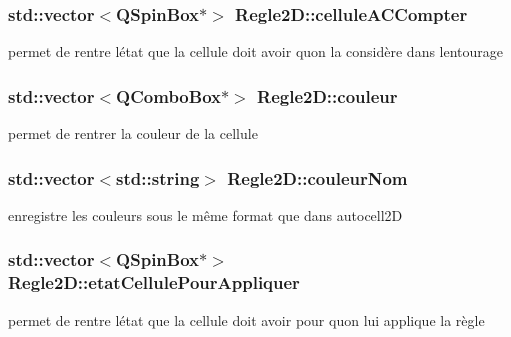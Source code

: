 \subsubsection[{\texorpdfstring{cellule\+A\+C\+Compter}{celluleACCompter}}]{\setlength{\rightskip}{0pt plus 5cm}std\+::vector$<$Q\+Spin\+Box$\ast$$>$ Regle2\+D\+::cellule\+A\+C\+Compter\hspace{0.3cm}{\ttfamily [protected]}}\hypertarget{class_regle2_d_aff3f269a5118bda47bcdf133d26010e6}{}\label{class_regle2_d_aff3f269a5118bda47bcdf133d26010e6}
permet de rentre l\textquotesingle{}état que la cellule doit avoir qu\textquotesingle{}on la considère dans l\textquotesingle{}entourage 
\subsubsection[{\texorpdfstring{couleur}{couleur}}]{\setlength{\rightskip}{0pt plus 5cm}std\+::vector$<$Q\+Combo\+Box$\ast$$>$ Regle2\+D\+::couleur\hspace{0.3cm}{\ttfamily [protected]}}\hypertarget{class_regle2_d_a57b848611ac63837d30790b5ddec9299}{}\label{class_regle2_d_a57b848611ac63837d30790b5ddec9299}
permet de rentrer la couleur de la cellule 
\subsubsection[{\texorpdfstring{couleur\+Nom}{couleurNom}}]{\setlength{\rightskip}{0pt plus 5cm}std\+::vector$<$std\+::string$>$ Regle2\+D\+::couleur\+Nom\hspace{0.3cm}{\ttfamily [protected]}}\hypertarget{class_regle2_d_aece48b7d62d4dc0ebfc8fd7334e7d9be}{}\label{class_regle2_d_aece48b7d62d4dc0ebfc8fd7334e7d9be}
enregistre les couleurs sous le même format que dans autocell2D 
\subsubsection[{\texorpdfstring{etat\+Cellule\+Pour\+Appliquer}{etatCellulePourAppliquer}}]{\setlength{\rightskip}{0pt plus 5cm}std\+::vector$<$Q\+Spin\+Box$\ast$$>$ Regle2\+D\+::etat\+Cellule\+Pour\+Appliquer\hspace{0.3cm}{\ttfamily [protected]}}\hypertarget{class_regle2_d_aa5356ff562ccfe9828275effb8866fa9}{}\label{class_regle2_d_aa5356ff562ccfe9828275effb8866fa9}
permet de rentre l\textquotesingle{}état que la cellule doit avoir pour qu\textquotesingle{}on lui applique la règle 
